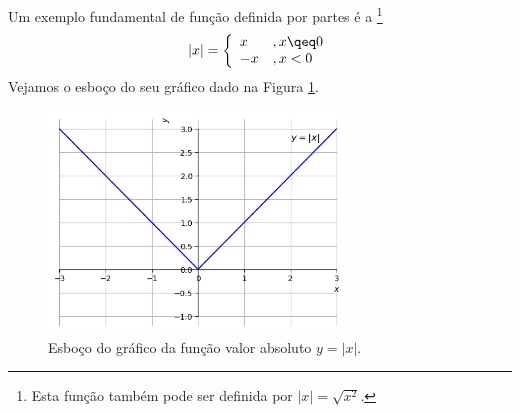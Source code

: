

Um exemplo fundamental de função definida por partes é a \footnote{Esta função também pode ser definida por $|x| = \sqrt{x^2}$.}
\begin{equation}
  |x| = \left\{
    \begin{array}{ll}
      x &, x\qeq 0\\
      -x &, x<0
    \end{array}
\right.
\end{equation}
Vejamos o esboço do seu gráfico dado na Figura \ref{fig:cap_funcao_funabs}.

\begin{figure}[H]
  \centering
  \includegraphics[width=0.7\textwidth]{./cap_funcao/dados/fig_cap_funcao_funabs/fig_cap_funcao_funabs}
  \caption{Esboço do gráfico da função valor absoluto $y=|x|$.}
  \label{fig:cap_funcao_funabs}
\end{figure}


